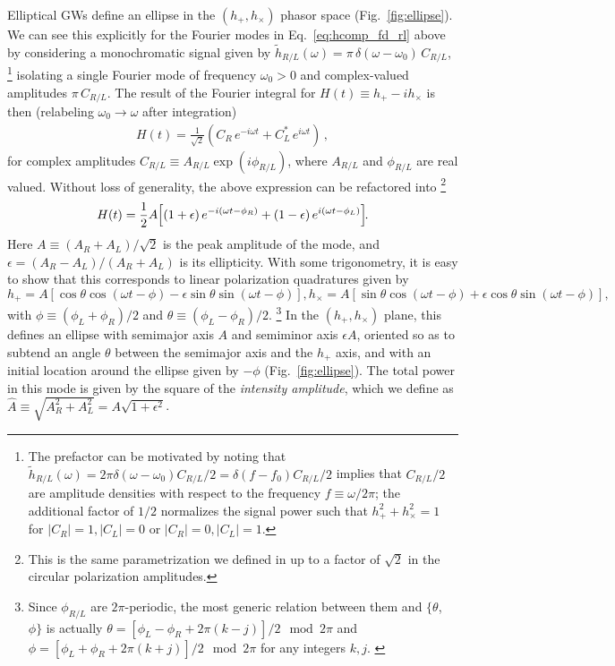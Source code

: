 \documentclass[aps,prd,twocolumn,superscriptaddress,preprintnumbers,floatfix,nofootinbib]{revtex4-2}
\newcommand{\beq}{\begin{equation}}
\newcommand{\eeq}{\end{equation}}
\begin{document}
Elliptical GWs define an ellipse in the $\left(h_+, h_\times\right)$ phasor space (Fig.~\ref{fig:ellipse}).
We can see this explicitly for the Fourier modes in Eq.~\eqref{eq:hcomp_fd_rl} above by considering a monochromatic signal given by $\tilde{h}_{R/L}(\omega) = \pi\, \delta(\omega-\omega_0)\, C_{R/L} $,%
\footnote{The prefactor can be motivated by noting that $\tilde{h}_{R/L}(\omega) = 2\pi \delta(\omega - \omega_0) C_{R/L}/2 = \delta(f - f_0) C_{R/L} / 2$ implies that $C_{R/L}/2$ are amplitude densities with respect to the frequency $f \equiv \omega/2\pi$; the additional factor of $1/2$ normalizes the signal power such that $h_+^2 + h_\times^2 = 1$ for $|C_R|=1, |C_L|=0$ or $|C_R|=0, |C_L|=1$.}
isolating a single Fourier mode of frequency $\omega_0 >0$ and complex-valued amplitudes $\pi\, C_{R/L}$.
The result of the Fourier integral for $H(t) \equiv h_+ - i h_\times$ is then (relabeling $\omega_0 \to \omega$ after integration)
\begin{align} \label{eq:ellip_circ}
H(t) =\frac{1}{\sqrt{2}} \left( C_R\, e^{-i \omega t} + C^*_L\, e^{i\omega t}\right)\, ,
\end{align}
for complex amplitudes $C_{R/L} \equiv A_{R/L} \exp(i\phi_{R/L})$, where $A_{R/L}$ and $\phi_{R/L}$ are real valued.
Without loss of generality, the above expression can be refactored into%
\footnote{This is the same parametrization we defined in \cite{Isi:2021iql} up to a factor of $\sqrt{2}$ in the circular polarization amplitudes.}
\begin{align}
H(t) = \frac{1}{2}A\hspace{-2pt}\left[ \left(1+\epsilon\right) e^{-i (\omega t - \phi_R)} + \left(1-\epsilon\right) e^{i (\omega t - \phi_L)} \right]\hspace{-3pt} .
\end{align}
Here 
$A \equiv (A_R + A_L)/ \sqrt{2}$ is the peak amplitude of the mode, and $\epsilon = (A_R - A_L)/(A_R + A_L)$ is its ellipticity.
With some trigonometry, it is easy to show that this corresponds to linear polarization quadratures given by
\begin{subequations} \label{eq:hcomp_ellip}
\beq
h_+ = A \left[\cos \theta \cos(\omega t - \phi) - \epsilon \sin \theta \sin(\omega t - \phi)\right] ,
\eeq
\beq
h_\times = A \left[\sin \theta \cos(\omega t - \phi) + \epsilon \cos \theta \sin(\omega t - \phi)\right] ,
\eeq
\end{subequations}
with $\phi \equiv (\phi_L + \phi_R)/2$ and $\theta \equiv (\phi_L - \phi_R)/2$.%
\footnote{Since $\phi_{R/L}$ are $2\pi$-periodic, the most generic relation between them and $\{\theta$, $\phi\}$ is actually $\theta = [\phi_L - \phi_R  + 2\pi (k-j)]/2 \mod 2\pi$ and $\phi = [\phi_L + \phi_R  + 2\pi (k+j)]/2 \mod 2\pi$ for any integers $k,j$. \label{foot:angles}}
In the $\left(h_+,h_\times\right)$ plane, this defines an ellipse with semimajor axis $A$ and semiminor axis $\epsilon A$, oriented so as to subtend an angle $\theta$ between the semimajor axis and the $h_+$ axis, and with an initial location around the ellipse given by $-\phi$ (Fig.~\ref{fig:ellipse}).
The total power in this mode is given by the square of the \emph{intensity amplitude}, which we define as $\hat{A} \equiv \sqrt{A_R^2 + A_L^2} = A \sqrt{1 + \epsilon^2}$.
\end{document}
